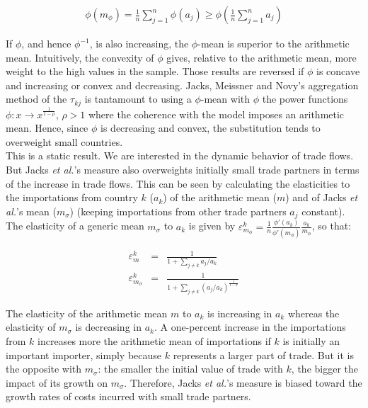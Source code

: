 \documentclass{article}
\begin{document}
\begin{eqnarray*}
\phi(m_{\phi})=\frac{1}{n}\sum_{j=1}^n\phi(a_j)\geq \phi\left(\frac{1}{n}\sum_{j=1}^n
a_j\right)
\end{eqnarray*}

If $\phi$, and hence $\phi^{-1}$, is also increasing, the
$\phi$-mean is superior to the arithmetic mean. Intuitively,
the convexity of $\phi$ gives, relative to the arithmetic mean,
more weight to the high values in the sample. Those results are
reversed if $\phi$ is concave and increasing or convex and
decreasing. Jacks, Meissner and Novy's aggregation method of
the $\tau_{kj}$ is tantamount to using a $\phi$-mean with
$\phi$ the power functions $\phi: x \rightarrow
x^{\frac{1}{1-\rho}}$, $\rho>1$ where the coherence with the
model imposes an arithmetic mean. Hence, since $\phi$ is
decreasing and convex, the substitution tends to overweight
small countries.\\

This is a static result. We are interested in the dynamic
behavior of trade flows. But Jacks \textit{et al.}'s measure also
overweights initially small trade partners in terms of the
increase in trade flows. This can be seen by calculating the
elasticities to the importations from country $k$ ($a_k$) of
the arithmetic mean ($m$) and of Jacks \textit{et al.}'s mean
($m_{\sigma}$) (keeping importations from other trade partners
$a_j$ constant). The elasticity of a generic mean $m_\sigma$ to
$a_k$ is given by
\mbox{$\varepsilon_{m_{\phi}}^k=\frac{1}{n}\frac{\phi'(a_k)}{\phi'(m_{\phi})}\frac{a_k}{m_{\phi}}$},
so that:

\begin{eqnarray*}
\varepsilon_m^k&=& \frac{1}{1+\sum\limits_{j \neq k} a_j/a_k}\\
\varepsilon_{m_{\sigma}}^k&=&\frac{1}{1+\sum\limits_{j\neq k} (a_j/a_k)^{\frac{1}{1-\sigma}}}
\end{eqnarray*}

The elasticity of the arithmetic mean $m$ to $a_k$ is
increasing in $a_k$ whereas the elasticity of $m_{\sigma}$ is
decreasing in $a_k$. A one-percent increase in the importations
from $k$ increases more the arithmetic mean of importations if
$k$ is initially an important importer, simply because $k$
represents a larger part of trade. But it is the opposite with
$m_{\sigma}$: the smaller the initial value of trade with $k$,
the bigger the impact of its growth on $m_{\sigma}$. Therefore,
Jacks \textit{et al.}'s measure is biased toward the growth rates of
costs incurred with small trade partners.



\end{document}

